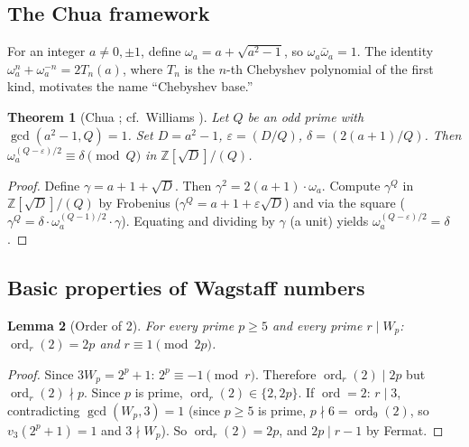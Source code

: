 \documentclass[12pt]{article}
\theoremstyle{plain}
\newtheorem{theorem}{Theorem}[section]
\newtheorem{lemma}[theorem]{Lemma}
\theoremstyle{definition}
\theoremstyle{remark}
\begin{document}
\subsection{The Chua framework}


For an integer \(a \neq 0, \pm 1\), define \(\omega_a = a + \sqrt{a^2-1}\),
so \(\omega_a \bar{\omega}_a = 1\). The identity
\(\omega_a^n + \omega_a^{-n} = 2T_n(a)\), where \(T_n\) is the
\(n\)-th Chebyshev polynomial of the first kind, motivates the
name ``Chebyshev base.''

\begin{theorem}[{Chua \cite{ref5}; cf.\ Williams \cite[Ch.~4]{ref17}}]\label{thm:chua}
Let \(Q\) be an odd prime with
\(\gcd(a^2-1, Q) = 1\). Set \(D = a^2-1\), \(\varepsilon = (D/Q)\),
\(\delta = (2(a+1)/Q)\). Then
\(\omega_a^{(Q-\varepsilon)/2} \equiv \delta \pmod{Q}\)
in \(\mathbb{Z}[\sqrt{D}]/(Q)\).
\end{theorem}


\begin{proof}
Define \(\gamma = a + 1 + \sqrt{D}\). Then
\(\gamma^2 = 2(a+1) \cdot \omega_a\). Compute \(\gamma^Q\) in
\(\mathbb{Z}[\sqrt{D}]/(Q)\) by Frobenius
(\(\gamma^Q = a + 1 + \varepsilon\sqrt{D}\)) and via the square
(\(\gamma^Q = \delta \cdot \omega_a^{(Q-1)/2} \cdot \gamma\)).
Equating and dividing by \(\gamma\) (a unit) yields
\(\omega_a^{(Q-\varepsilon)/2} = \delta\).\end{proof}


\subsection{Basic properties of Wagstaff numbers}


\begin{lemma}[Order of 2]\label{lem:ord-2}
For every prime \(p \geq 5\) and every
prime \(r \mid W_p\): \(\operatorname{ord}_r(2) = 2p\) and
\(r \equiv 1 \pmod{2p}\).
\end{lemma}


\begin{proof}
Since \(3W_p = 2^p + 1\): \(2^p \equiv -1 \pmod{r}\).
Therefore \(\operatorname{ord}_r(2) \mid 2p\) but
\(\operatorname{ord}_r(2) \nmid p\). Since \(p\) is prime,
\(\operatorname{ord}_r(2) \in \{2, 2p\}\). If \(\operatorname{ord} = 2\):
\(r \mid 3\), contradicting \(\gcd(W_p, 3) = 1\)
(since \(p \geq 5\) is prime, \(p \nmid 6 = \operatorname{ord}_9(2)\),
so \(v_3(2^p+1) = 1\) and \(3 \nmid W_p\)). So
\(\operatorname{ord}_r(2) = 2p\), and \(2p \mid r-1\) by Fermat.\end{proof}
\end{document}
